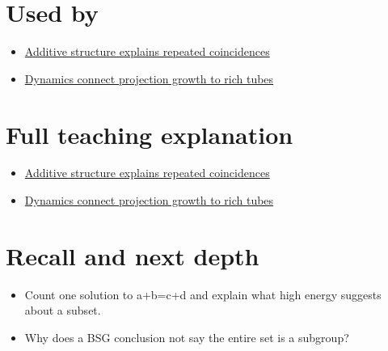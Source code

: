 \section{Used by}\label{appendix-b0732b22e7d6-used-by}

\begin{itemize}
\tightlist
\item
  \href{Continuous\%20Notes/University\%20-\%20Worlds,\%20Images\%20and\%20Inference\%20-\%20Graphics,\%20Vision\%20and\%20Photography\#Additive\%20structure\%20explains\%20repeated\%20coincidences}{Additive structure explains repeated coincidences}
\item
  \href{Continuous\%20Notes/University\%20-\%20Worlds,\%20Images\%20and\%20Inference\%20-\%20Graphics,\%20Vision\%20and\%20Photography\#Dynamics\%20connect\%20projection\%20growth\%20to\%20rich\%20tubes}{Dynamics connect projection growth to rich tubes}
\end{itemize}

\section{Full teaching explanation}\label{appendix-b0732b22e7d6-full-teaching-explanation}

\begin{itemize}
\tightlist
\item
  \href{Continuous\%20Notes/University\%20-\%20Worlds,\%20Images\%20and\%20Inference\%20-\%20Graphics,\%20Vision\%20and\%20Photography\#Additive\%20structure\%20explains\%20repeated\%20coincidences}{Additive structure explains repeated coincidences}
\item
  \href{Continuous\%20Notes/University\%20-\%20Worlds,\%20Images\%20and\%20Inference\%20-\%20Graphics,\%20Vision\%20and\%20Photography\#Dynamics\%20connect\%20projection\%20growth\%20to\%20rich\%20tubes}{Dynamics connect projection growth to rich tubes}
\end{itemize}

\section{Recall and next depth}\label{appendix-b0732b22e7d6-recall-and-next-depth}

\begin{itemize}
\tightlist
\item
  Count one solution to a+b=c+d and explain what high energy suggests about a subset.
\item
  Why does a BSG conclusion not say the entire set is a subgroup?
\end{itemize}

